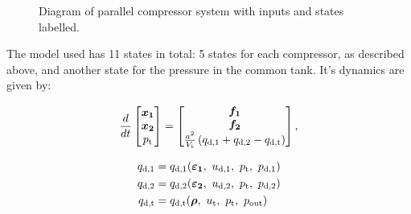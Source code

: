 \begin{figure}

  \caption{Diagram of parallel compressor system with inputs and states labelled.}
  \label{fig:mod:parallel}
\end{figure}



The model used has 11 states in total: 5 states for each compressor, as described above, and another state for the pressure in the common tank. It's dynamics are given by:

\begin{equation}
  \frac{d}{dt}\begin{bmatrix}
    \bm{x_1}\\
    \bm{x_2}\\
    p_\text{t}
  \end{bmatrix}
  =
  \begin{bmatrix}
    \bm{f_1}\\
    \bm{f_2}\\
    \frac{a^2}{V_\text{t}}\left(q_{\text{d,1}}+q_{\text{d,2}}-q_{\text{d,t}}\right)
  \end{bmatrix},
\end{equation}

\begin{equation}
  \begin{split}
    q_{\text{d,1}} & = q_{\text{d,1}}(\bm{\varepsilon_1},\ u_{\text{d},1},\ p_{\text{t}},\ p_{\text{d,1}})\\
    q_{\text{d,2}} & = q_{\text{d,2}}(\bm{\varepsilon_2},\ u_{\text{\text{d}},2},\ p_{\text{t}},\ p_{\text{d,2}})\\
    q_{\text{d,t}} & = q_{\text{d,t}}(\bm{\rho},\ u_{\text{t}},\ p_\text{t},\ p_{\text{out}})
  \end{split}
\end{equation}

